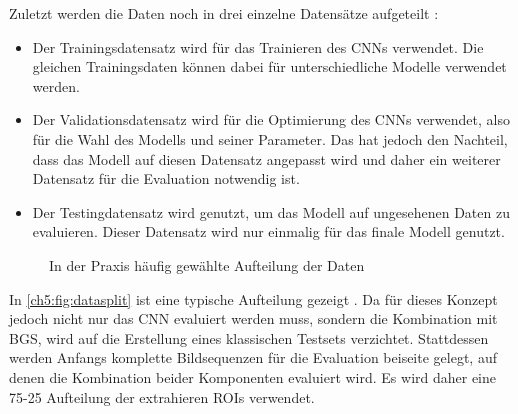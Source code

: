 \bigskip
Zuletzt werden die Daten noch in drei einzelne Datensätze aufgeteilt :
\begin{itemize}
    \item{Der Trainingsdatensatz
        wird für das Trainieren des \ac{CNN}s verwendet.
        Die gleichen Trainingsdaten können dabei für unterschiedliche Modelle verwendet werden.}
    \item{Der Validationsdatensatz
        wird für die Optimierung des \ac{CNN}s verwendet, also für die Wahl des Modells und seiner Parameter.
        Das hat jedoch den Nachteil, dass das Modell auf diesen Datensatz angepasst wird und daher ein weiterer Datensatz für die Evaluation notwendig ist.}
    \item{Der Testingdatensatz
        wird genutzt, um das Modell auf ungesehenen Daten zu evaluieren.
        Dieser Datensatz wird nur einmalig für das finale Modell genutzt. } 
\end{itemize}

\begin{figure}[ht]
    \begin{small}
        \begin{center}
            
        \end{center}
        \caption{In der Praxis häufig gewählte Aufteilung der Daten}
        \label{ch5:fig:datasplit}
    \end{small}
\end{figure}

In \autoref{ch5:fig:datasplit} ist eine typische Aufteilung gezeigt \cite{suthaharan_machine_2016}.
Da für dieses Konzept jedoch nicht nur das \ac{CNN} evaluiert werden muss, sondern die Kombination mit \ac{BGS}, wird auf die Erstellung eines klassischen Testsets verzichtet.
Stattdessen werden Anfangs komplette Bildsequenzen für die Evaluation beiseite gelegt, auf denen die Kombination beider Komponenten evaluiert wird.
Es wird daher eine 75-25 Aufteilung der extrahieren \acp{ROI} verwendet.



